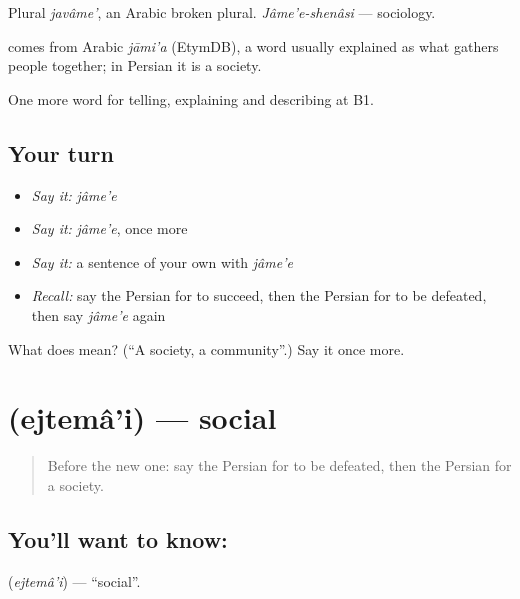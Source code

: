 Plural \emph{javâme'}, an Arabic broken plural. \emph{Jâme'e-shenâsi} — sociology.

\begin{cousinweb}
\textbf{} comes from Arabic \emph{jāmi'a} (EtymDB), a word usually explained as what gathers people together; in Persian it is a society.
\end{cousinweb}

\begin{grammarlens}[title={What you've built}]
One more word for telling, explaining and describing at B1.
\end{grammarlens}

\subsection*{Your turn}
\begin{itemize}
\raggedright
  \item \emph{Say it:} \emph{jâme'e}
  \item \emph{Say it:} \emph{jâme'e}, once more
  \item \emph{Say it:} a sentence of your own with \emph{jâme'e}
  \item \emph{Recall:} say the Persian for to succeed, then the Persian for to be defeated, then say \emph{jâme'e} again
\end{itemize}

\begin{tcolorbox}[breakable,colback=teal!4,colframe=teal!35!black,title={Before you move on}]
What does  mean? (\textquotedblleft{}A society, a community\textquotedblright{}.) Say it once more.
\end{tcolorbox}
\section[\texorpdfstring{\fa{اجتماعی} (ejtemâ'i)}{اجتماعی (ejtemâ'i)}]{ (ejtemâ'i) — social}

\label{lesson:FA-C385-ejtemai}



\begin{quote}
Before the new one: say the Persian for to be defeated, then the Persian for a society.
\end{quote}

\subsection*{You'll want to know: }
\textbf{} (\emph{ejtemâ'i}) — \textquotedblleft{}social\textquotedblright{}.


